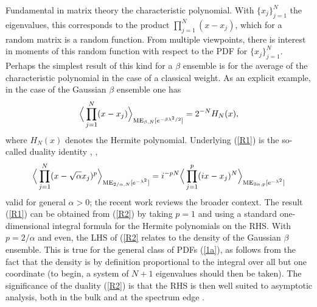 \documentclass[11pt,a4paper]{article}
\numberwithin{equation}{section} %
\theoremstyle{plain}
\theoremstyle{definition}
\numberwithin{prop}{section}
\numberwithin{cor}{section}
\numberwithin{remark}{section}
\begin{document}
Fundamental in matrix theory the characteristic polynomial. With $\{ x_j \}_{j=1}^N$ the eigenvalues, this corresponds to the product
$\prod_{j=1}^N ( x - x_j)$, which for a random matrix is a random function. From multiple viewpoints, there is interest in moments
of this random function with respect to the PDF for $\{ x_j \}_{j=1}^N$. Perhaps the simplest result of this kind for a $\beta$ ensemble
is for the average of the characteristic polynomial in the case of a classical weight. As an explicit example, in the case of the Gaussian
$\beta$ ensemble one has \cite{BF97a,De09}
 \begin{equation}\label{R1}
  \Big  \langle   \prod_{j=1}^N (x - x_j ) \Big \rangle_{{\rm ME}_{\beta,N}[e^{-\beta \lambda^2/2}]} = 2^{-N} H_N(x),
  \end{equation}  
  where $H_N(x)$ denotes the Hermite polynomial. Underlying (\ref{R1}) is the so-called duality identity
\cite{BF97a}, \cite{De09}, \cite[Eq.~(13.162)]{Fo10}
\begin{equation}\label{R2}
    \Big  \langle    \prod_{j=1}^N ( x  -  \sqrt{\alpha} x_j )^p     \Big  \rangle_{ {\rm ME}_{2/\alpha,N}[e^{-\lambda^2}]} =
   i^{-pN} \Big  \langle   \prod_{j=1}^p  ( i  x  -  x_j)^N \Big  \rangle_{{\rm ME}_{2 \alpha,p}[e^{-\lambda^2}]}
   \end{equation}  
valid for general $\alpha > 0$; the recent work \cite{Fo25+} reviews the broader context. The result (\ref{R1}) can be obtained from (\ref{R2}) by taking
$p=1$ and using a standard one-dimensional integral formula for the Hermite polynomials on the RHS.
With $p=2/\alpha$ and even, the LHS of (\ref{R2} relates to the density of the Gaussian $\beta$ ensemble.
This is true for the general class of PDFs (\ref{1a}), as follows 
from the fact that the density  is by definition proportional to the integral over
all but one coordinate (to begin, a system of $N+1$ eigenvalues should then be taken). The significance of the
duality (\ref{R2}) is that the RHS is then well suited to asymptotic analysis, both in the bulk and at the spectrum
edge \cite{BF97a,DF06,DL14,DL15}.
\end{document}
